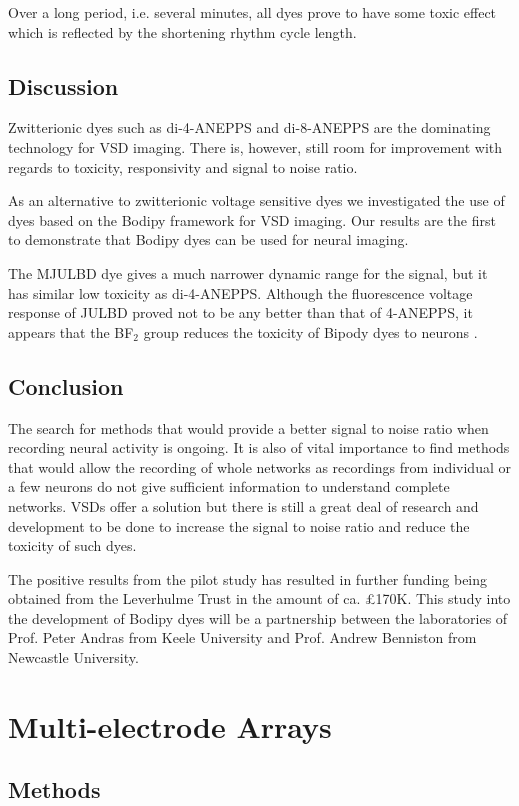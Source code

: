 Over a long period, i.e. several minutes, all dyes prove to have some toxic effect which is reflected by the shortening rhythm cycle length.

\subsection{Discussion}
Zwitterionic dyes such as di-4-ANEPPS and di-8-ANEPPS are the dominating technology for \ac{VSD} imaging. There is, however, still room for improvement  with regards to toxicity, responsivity and signal to noise ratio.

As an alternative to zwitterionic voltage sensitive dyes we investigated the use of dyes based on the Bodipy framework for \ac{VSD} imaging. Our results are the first to demonstrate that Bodipy dyes can be used for neural imaging.

The MJULBD dye gives a much narrower dynamic range for the signal, but it has similar low toxicity as di-4-ANEPPS. Although the fluorescence voltage response of JULBD proved not to be any better than that of 4-ANEPPS, it appears that the BF$_{2}$ group reduces the toxicity of Bipody dyes to neurons \cite{Bai2014}.

\subsection{Conclusion}
The search for methods that would provide a better signal to noise ratio when recording neural activity is ongoing. It is also of vital importance to find methods that would allow the recording of whole networks as recordings from individual or a few neurons do not give sufficient information to understand complete networks. \Acp{VSD} offer a solution but there is still a great deal of research and development to be done to increase the signal to noise ratio and reduce the toxicity of such dyes.

The positive results from the pilot study has resulted in further funding being obtained from the Leverhulme Trust in the amount of ca. \pounds 170K. This study into the development of Bodipy dyes will be a partnership between the laboratories of Prof. Peter Andras from Keele University and Prof. Andrew Benniston from Newcastle University.

\section{Multi-electrode Arrays}
\subsection{Methods}
\label{subsec:MEA}

